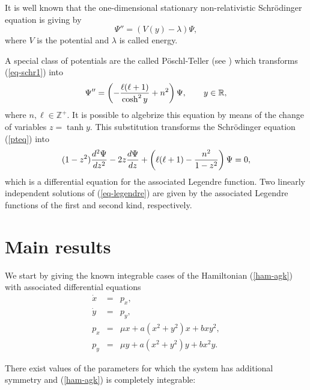 \documentclass[final]{siamart0516}
\begin{document}
It is well known that the one-dimensional stationary non-relativistic Schr\"odinger equation is giving by
\begin{equation}\label{eq-schr1}
\Psi'' = (V(y)-\lambda)\Psi,
\end{equation}
where $V$ is the potential and  $\lambda$ is called energy.

A special class of potentials are the called P\"oschl-Teller  (see \cite{poschl,T}) which transforms 
(\ref{eq-schr1}) into
\begin{equation}\label{pteq}
\Psi''=\left(-{\ell(\ell+1)\over \cosh^2 y}+n^2\right)\Psi, \qquad y\in \mathbb{R},
\end{equation}
where  $n,\ell\in\mathbb{Z}^+$. 
It is possible to algebrize this equation by means of the change  of variables  $z = \tanh y$. This substitution transforms the Schr\"odinger equation (\ref{pteq})  into
\begin{equation}\label{eq-legendre}
 (1-z^2){d^2\Psi \over dz^2} -2z{d\Psi\over dz}+\left({\ell(\ell+1)}-{n^2\over 1-z^2}\right) \Psi=0,
 \end{equation}
 which is a  differential equation for the associated Legendre function. Two linearly independent solutions of
(\ref{eq-legendre})  are given by the associated Legendre functions of the first and second kind, respectively.

\section{Main results}\label{resultados}
We start by giving the  known integrable cases of the Hamiltonian (\ref{ham-agk})
with associated  differential equations 
\begin{eqnarray}\label{eq-ham}
\dot{x} &=& p_x, \nonumber\\
\dot{y} &=& p_y,\nonumber\\
p_x &=& \mu x+ a(x^2+y^2)x+bxy^2, \nonumber\\
p_y &=& \mu y+ a(x^2+y^2)y+bx^2y. \nonumber
\end{eqnarray}

There exist values of the parameters  for which  the system has additional symmetry and (\ref{ham-agk}) is completely integrable:
\end{document}
